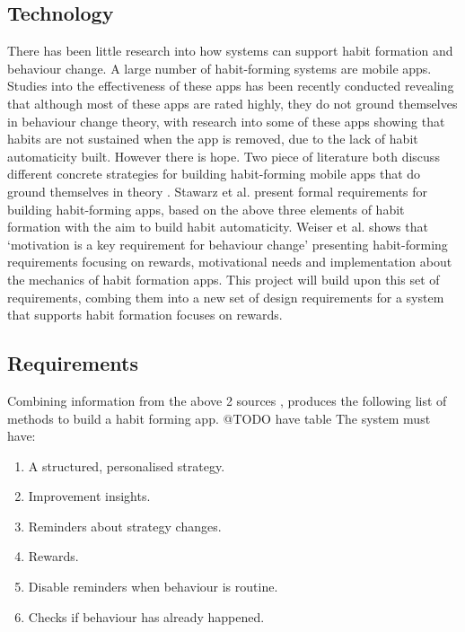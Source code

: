\subsection{Technology}
There has been little research into how systems can support habit formation and behaviour change. A large number of habit-forming systems are mobile apps. Studies into the effectiveness of these apps has been recently conducted \cite{article_dont_kick_habit, article_beyond_article_dont_kick_habit_tracking_designing_apps} revealing that although most of these apps are rated highly, they do not ground themselves in behaviour change theory, with research into some of these apps showing that habits are not sustained when the app is removed, due to the lack of habit automaticity built.\newline
\newline
However there is hope. Two piece of literature both discuss different concrete strategies for building habit-forming mobile apps that do ground themselves in theory \cite{article_beyond_self_tracking_designing_apps, article_taxonomy_motivational_affordances_meaningful}. Stawarz et al. \cite{article_beyond_self_tracking_designing_apps} present formal requirements for building habit-forming apps, based on the above three elements of habit formation with the aim to build habit automaticity. Weiser et al. \cite{article_taxonomy_motivational_affordances_meaningful} shows that `motivation is a key requirement for behaviour change' presenting habit-forming requirements focusing on rewards, motivational needs and implementation about the mechanics of habit formation apps. This project will build upon this set of requirements, combing them into a new set of design requirements for a system that supports habit formation focuses on rewards.

\subsection{Requirements}
Combining information from the above 2 sources \cite{article_beyond_self_tracking_designing_apps, article_taxonomy_motivational_affordances_meaningful}, produces the following list of methods to build a habit forming app.\newline
@TODO have table
\newline
The system must have:

\begin{enumerate}
  \item A structured, personalised strategy.
  \item Improvement insights.
  \item Reminders about strategy changes.
  \item Rewards.
  \item Disable reminders when behaviour is routine.
  \item Checks if behaviour has already happened.
\end{enumerate}

